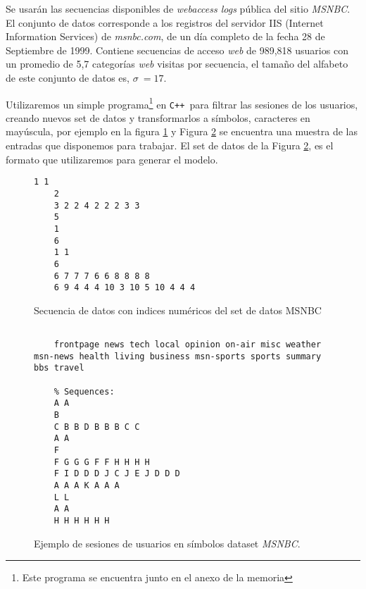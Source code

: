 
Se usarán las secuencias disponibles de \emph{webaccess logs} pública del sitio \emph{MSNBC}. El conjunto de datos corresponde a los registros del servidor {IIS} (Internet Information Services) de \emph{msnbc.com}, de un día completo de la fecha  28 de Septiembre de 1999. 
Contiene secuencias de acceso \emph{web} de 989,818 usuarios con un promedio de 5,7 categorías \emph{web} visitas por secuencia, el tamaño del alfabeto de este conjunto de datos es, $\sigma \ = 17$.




Utilizaremos un simple programa\footnote{Este programa se encuentra junto en el anexo de la memoria} en \texttt{C++ }para filtrar las sesiones de los usuarios, creando nuevos set de datos y transformarlos a símbolos, caracteres en mayúscula, por ejemplo en la figura \ref{fig:sesiones-ds-msbc-num}  y Figura \ref{fig:sesiones-ds-basicos} se encuentra una muestra de las entradas que disponemos para trabajar. El set de datos de la Figura \ref{fig:sesiones-ds-basicos}, es el formato que utilizaremos para generar el modelo.


\begin{figure}[t] 
	\centering
	\begin{lstlisting}[frame=single,basicstyle=\ttfamily\tiny,]
	1 1 
	2 
	3 2 2 4 2 2 2 3 3 
	5 
	1 
	6 
	1 1 
	6 
	6 7 7 7 6 6 8 8 8 8 
	6 9 4 4 4 10 3 10 5 10 4 4 4 
	\end{lstlisting}	
	\caption{Secuencia de datos con indices numéricos del set de datos MSNBC}
	\label{fig:sesiones-ds-msbc-num}
\end{figure}




\begin{figure}[t] 
	\centering
	\begin{lstlisting}[frame=single,basicstyle=\ttfamily\tiny,]
	% Different categories found in input file:
	
	frontpage news tech local opinion on-air misc weather msn-news health living business msn-sports sports summary bbs travel
	
	% Sequences:
	A A 
	B 
	C B B D B B B C C 
	A A 
	F 
	F G G G F F H H H H 
	F I D D D J C J E J D D D 
	A A A K A A A 
	L L 
	A A 
	H H H H H H 
	\end{lstlisting}
	\caption{Ejemplo de sesiones de usuarios en símbolos dataset \emph{MSNBC}.}
	\label{fig:sesiones-ds-basicos}
\end{figure}






